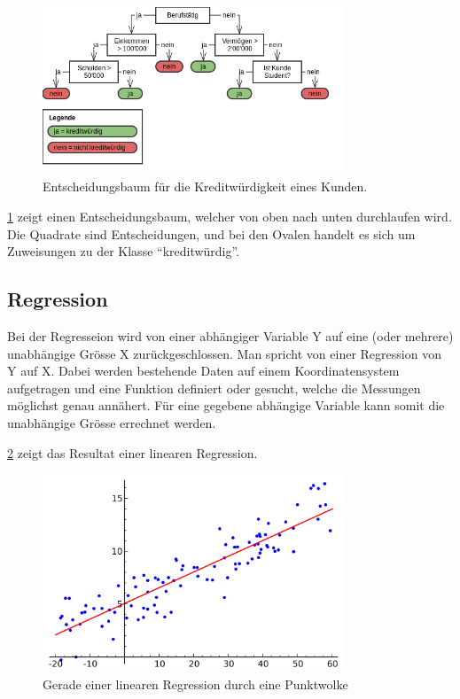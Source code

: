 \begin{figure}[H]
	\centering
	\includegraphics[width=0.8\textwidth]{images/decision_tree.png}
	\caption{Entscheidungsbaum für die Kreditwürdigkeit eines Kunden.}
	\label{fig:recherche:dataminingtechniken:disziplinen:classification}
\end{figure}

\cref{fig:recherche:dataminingtechniken:disziplinen:classification} zeigt einen Entscheidungsbaum, welcher von oben nach unten durchlaufen wird. Die Quadrate sind Entscheidungen, und bei den Ovalen handelt es sich um Zuweisungen zu der Klasse "`kreditwürdig"'.


\subsection{Regression}
\label{sec:recherche:dataminingtechniken:disziplinen:regression}
Bei der Regresseion wird von einer abhängiger Variable Y auf eine (oder mehrere) unabhängige Grösse X zurückgeschlossen. Man spricht von einer Regression von Y auf X. Dabei werden bestehende Daten auf einem Koordinatensystem aufgetragen und eine Funktion definiert oder gesucht, welche die Messungen möglichst genau annähert. Für eine gegebene abhängige Variable kann somit die unabhängige Grösse errechnet werden. 

\cref{fig:recherche:dataminingtechniken:disziplinen:regression} zeigt das Resultat einer linearen Regression.

\begin{figure}[H]
	\RawFloats
	\centering
	\includegraphics[width=0.8\textwidth]{images/Linear_regression.png}
	\caption{Gerade einer linearen Regression durch eine Punktwolke}
	\label{fig:recherche:dataminingtechniken:disziplinen:regression}
\end{figure}

